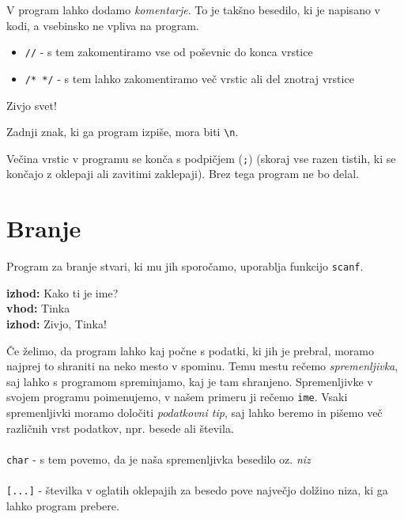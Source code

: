 \documentclass{book}
\begin{document}
\newpage
\noindent V program lahko dodamo \emph{komentarje}. To je takšno besedilo, ki je napisano v kodi, a vsebinsko ne vpliva na program.
\begin{itemize}
	\item \verb+//+ - s tem zakomentiramo vse od poševnic do konca vrstice
	\item \verb+/* */+ - s tem lahko zakomentiramo več vrstic ali del znotraj vrstice
\end{itemize}

\begin{examples}


\begin{inout}
\tcblower
Zivjo svet!
\end{inout}

\end{examples}

\begin{errors}
Zadnji znak, ki ga program izpiše, mora biti \verb+\n+.
\end{errors}

\begin{errors}
Večina vrstic v programu se konča s podpičjem (\verb+;+) (skoraj vse razen tistih, ki se končajo z oklepaji  ali zavitimi zaklepaji). Brez tega program ne bo delal.
\end{errors}

\newpage
\section{Branje}
Program za branje stvari, ki mu jih sporočamo, uporablja funkcijo \verb+scanf+.

\begin{examples}


\begin{inout}
{\color{blue} \bf izhod:} Kako ti je ime?\\
{\color{blue} \bf vhod:} Tinka \\
{\color{blue} \bf izhod:} Zivjo, Tinka!
\end{inout}

\end{examples}


Če želimo, da program lahko kaj počne s podatki, ki jih je prebral, moramo najprej to shraniti na neko mesto v spominu. Temu mestu rečemo \emph{spremenljivka}, saj lahko s programom spreminjamo, kaj je tam shranjeno. Spremenljivke v svojem programu poimenujemo, v našem primeru ji rečemo \verb+ime+. Vsaki spremenljivki moramo določiti \emph{podatkovni tip}, saj lahko beremo in pišemo več različnih vrst podatkov, npr. besede ali števila. \\\\
\verb+char+ - s tem povemo, da je naša spremenljivka besedilo oz. \emph{niz} \\\\
\verb+[...]+ - številka v oglatih oklepajih za besedo pove največjo dolžino niza, ki ga lahko program prebere.
\end{document}
